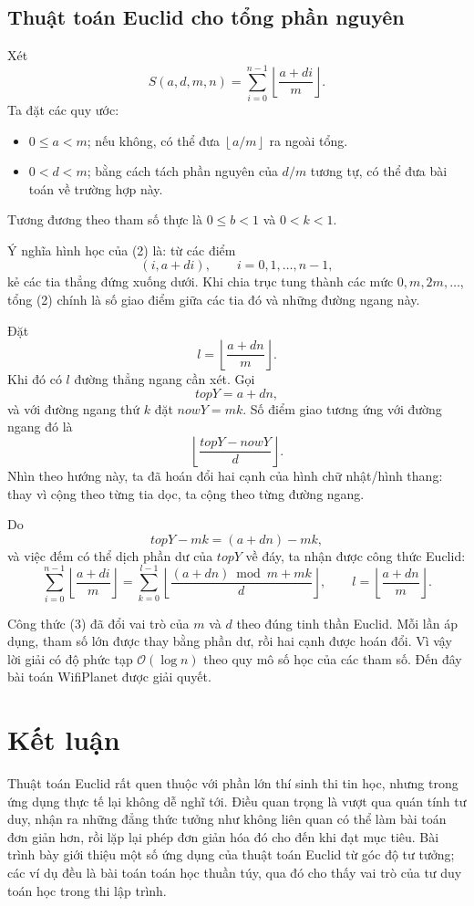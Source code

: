 \documentclass[11pt]{article}
\newcommand{\Oh}{\mathcal{O}}
\newcommand{\floor}[1]{\left\lfloor #1\right\rfloor}
\begin{document}
\subsection{Thuật toán Euclid cho tổng phần nguyên}

Xét
\[
  S(a,d,m,n)=\sum_{i=0}^{n-1}\floor{\frac{a+di}{m}}.
\]
Ta đặt các quy ước:
\begin{itemize}
  \item $0\le a<m$; nếu không, có thể đưa $\floor{a/m}$ ra ngoài tổng.
  \item $0<d<m$; bằng cách tách phần nguyên của $d/m$ tương tự, có thể đưa bài
  toán về trường hợp này.
\end{itemize}
Tương đương theo tham số thực là $0\le b<1$ và $0<k<1$.

Ý nghĩa hình học của (2) là: từ các điểm
\[
  (i,a+di),\qquad i=0,1,\ldots,n-1,
\]
kẻ các tia thẳng đứng xuống dưới. Khi chia trục tung thành các mức
$0,m,2m,\ldots$, tổng (2) chính là số giao điểm giữa các tia đó và những
đường ngang này.

Đặt
\[
  l=\floor{\frac{a+dn}{m}}.
\]
Khi đó có $l$ đường thẳng ngang cần xét. Gọi
\[
  \mathit{topY}=a+dn,
\]
và với đường ngang thứ $k$ đặt $\mathit{nowY}=mk$. Số điểm giao tương ứng với
đường ngang đó là
\[
  \floor{\frac{\mathit{topY}-\mathit{nowY}}{d}}.
\]
Nhìn theo hướng này, ta đã hoán đổi hai cạnh của hình chữ nhật/hình thang:
thay vì cộng theo từng tia dọc, ta cộng theo từng đường ngang.

Do
\[
  \mathit{topY}-mk=(a+dn)-mk,
\]
và việc đếm có thể dịch phần dư của $\mathit{topY}$ về đáy, ta nhận được công
thức Euclid:
\[
  \sum_{i=0}^{n-1}\floor{\frac{a+di}{m}}
  =
  \sum_{k=0}^{l-1}
  \floor{\frac{(a+dn)\bmod m+mk}{d}},
  \qquad
  l=\floor{\frac{a+dn}{m}}. \tag{3}
\]

Công thức (3) đã đổi vai trò của $m$ và $d$ theo đúng tinh thần Euclid. Mỗi
lần áp dụng, tham số lớn được thay bằng phần dư, rồi hai cạnh được hoán đổi.
Vì vậy lời giải có độ phức tạp $\Oh(\log n)$ theo quy mô số học của các tham
số. Đến đây bài toán WifiPlanet được giải quyết.

\section{Kết luận}

Thuật toán Euclid rất quen thuộc với phần lớn thí sinh thi tin học, nhưng
trong ứng dụng thực tế lại không dễ nghĩ tới. Điều quan trọng là vượt qua quán
tính tư duy, nhận ra những đẳng thức tưởng như không liên quan có thể làm bài
toán đơn giản hơn, rồi lặp lại phép đơn giản hóa đó cho đến khi đạt mục tiêu.
Bài trình bày giới thiệu một số ứng dụng của thuật toán Euclid từ góc độ tư
tưởng; các ví dụ đều là bài toán toán học thuần túy, qua đó cho thấy vai trò
của tư duy toán học trong thi lập trình.
\end{document}
